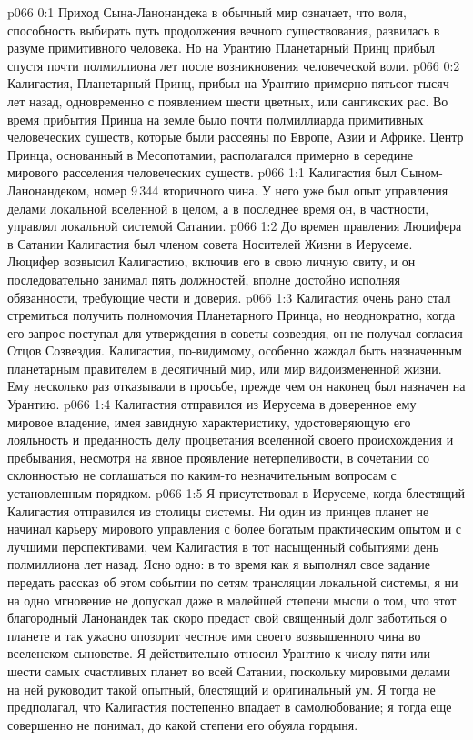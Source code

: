 \author{Мелхиседек}
\vs p066 0:1 Приход Сына\hyp{}Ланонандека в обычный мир означает, что воля, способность выбирать путь продолжения вечного существования, развилась в разуме примитивного человека. Но на Урантию Планетарный Принц прибыл спустя почти полмиллиона лет после возникновения человеческой воли.
\vs p066 0:2 Калигастия, Планетарный Принц, прибыл на Урантию примерно пятьсот тысяч лет назад, одновременно с появлением шести цветных, или сангикских рас. Во время прибытия Принца на земле было почти полмиллиарда примитивных человеческих существ, которые были рассеяны по Европе, Азии и Африке. Центр Принца, основанный в Месопотамии, располагался примерно в середине мирового расселения человеческих существ.
\vs p066 1:1 Калигастия был Сыном\hyp{}Ланонандеком, номер 9\,344 вторичного чина. У него уже был опыт управления делами локальной вселенной в целом, а в последнее время он, в частности, управлял локальной системой Сатании.
\vs p066 1:2 До времен правления Люцифера в Сатании Калигастия был членом совета Носителей Жизни в Иерусеме. Люцифер возвысил Калигастию, включив его в свою личную свиту, и он последовательно занимал пять должностей, вполне достойно исполняя обязанности, требующие чести и доверия.
\vs p066 1:3 \pc Калигастия очень рано стал стремиться получить полномочия Планетарного Принца, но неоднократно, когда его запрос поступал для утверждения в советы созвездия, он не получал согласия Отцов Созвездия. Калигастия, по\hyp{}видимому, особенно жаждал быть назначенным планетарным правителем в десятичный мир, или мир видоизмененной жизни. Ему несколько раз отказывали в просьбе, прежде чем он наконец был назначен на Урантию.
\vs p066 1:4 Калигастия отправился из Иерусема в доверенное ему мировое владение, имея завидную характеристику, удостоверяющую его лояльность и преданность делу процветания вселенной своего происхождения и пребывания, несмотря на явное проявление нетерпеливости, в сочетании со склонностью не соглашаться по каким\hyp{}то незначительным вопросам с установленным порядком.
\vs p066 1:5 Я присутствовал в Иерусеме, когда блестящий Калигастия отправился из столицы системы. Ни один из принцев планет не начинал карьеру мирового управления с более богатым практическим опытом и с лучшими перспективами, чем Калигастия в тот насыщенный событиями день полмиллиона лет назад. Ясно одно: в то время как я выполнял свое задание передать рассказ об этом событии по сетям трансляции локальной системы, я ни на одно мгновение не допускал даже в малейшей степени мысли о том, что этот благородный Ланонандек так скоро предаст свой священный долг заботиться о планете и так ужасно опозорит честное имя своего возвышенного чина во вселенском сыновстве. Я действительно относил Урантию к числу пяти или шести самых счастливых планет во всей Сатании, поскольку мировыми делами на ней руководит такой опытный, блестящий и оригинальный ум. Я тогда не предполагал, что Калигастия постепенно впадает в самолюбование; я тогда еще совершенно не понимал, до какой степени его обуяла гордыня.
